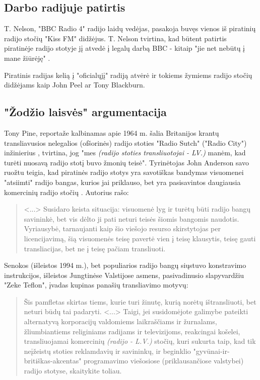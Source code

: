 \documentclass[kursinis-darbas]{vukf}
\begin{document}
\subsection{Darbo radijuje patirtis}

T. Nelson, "\gls{BBC} Radio 4" radijo laidų vedėjas, pasakoja buvęs vienos iš piratinių radijo stočių "Kiss FM" didžėjus. T. Nelson tvirtina, kad būtent patirtis piratinėje radijo stotyje jį atvedė į legalų darbą \gls{BBC} - kitaip "jie net nebūtų į mane žiūrėję" \cite{bbc_radio_4_do_pirates_rule_the_air_waves}.

Piratinis radijas kelią į "oficialųjį" radiją atvėrė ir tokiems žymiems radijo stočių didžėjams kaip John Peel ar Tony Blackburn.

\subsection{"Žodžio laisvės" argumentacija}

Tony Pine, reportaže kalbinamas apie 1964 m. šalia Britanijos krantų transliavusios nelegalios (ofšorinės) radijo stoties "Radio Sutch" ("Radio City") inžinierius \cite{tony_pine}, tvirtina, jog "mes \emph{(radijo stoties transliuotojai - LV.)} manėm, kad turėti nuosavą radijo stotį buvo žmonių teisė". Tyrinėtojas John Anderson savo ruožtu teigia, kad piratinės radijo stotys yra savotiškas bandymas visuomenei "atsiimti" radijo bangas, kurios jai priklauso, bet yra pasisavintos daugiausia komercinių radijo stočių \cite[p.~1-2]{ja_a_can_of_worms_pirate_radio_as_public_intransigence_of_the_public_airwaves}. Autorius rašo:

\begin{quotation}
	<...> Susidaro keista situacija: visuomenė lyg ir turėtų būti radijo bangų savininkė, bet vis dėlto ji pati neturi teisės šiomis bangomis naudotis. Vyriausybė, tarnaujanti kaip šio viešojo resurso skirstytojas per licencijavimą, šią visuomenės teisę pavertė vien į teisę klausytis, teisę gauti transliacijas, bet ne į teisę pačiam transliuoti.
\end{quotation}

Senokos (išleistos 1994 m.), bet populiarios radijo bangų siųstuvo konstravimo instrukcijos, išleistos Jungtinėse Valstijose asmens, pasivadinusio slapyvardžiu "Zeke Teflon", įvadas \cite{zt_complete_manual_of_pirate_radio} kupinas panašių transliavimo motyvų:

\begin{quotation}
	Šis pamfletas skirtas tiems, kurie turi žinutę, kurią norėtų ištransliuoti, bet neturi būdų tai padaryti. <...> Taigi, jei susidomėjote galimybe pateikti alternatyvą korporacijų valdomiems laikraščiams ir žurnalams, žliumbiantiems religiniams radijams ir televizijoms, reakcingai košelei, transliuojamai komercinių \emph{(radijo - L.V.)} stočių, kuri sukurta taip, kad tik neįžeistų stoties reklamdavių ir savininkų, ir beginklio "gyvūnai-ir-britiškas-akcentas" programavimo viešosiose (priklausančiose valstybei) radijo stotyse, skaitykite toliau.
\end{quotation}
\end{document}
